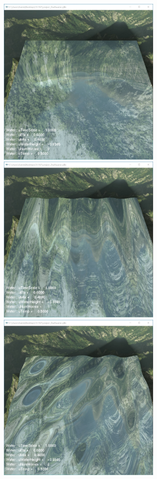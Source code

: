 \documentclass[letterpaper,14pt,titlepage,fleqn]{article}
\begin{document}
\begin{center}
	\includegraphics[width=3.2in]{wave0.jpg}
	\includegraphics[width=3.2in]{wave1.jpg}
	\includegraphics[width=3.2in]{wave2.jpg}

\end{center}
\end{document}
